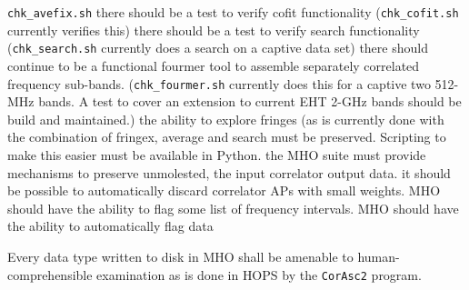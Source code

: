 \begin{description}
    \texttt{chk\_avefix.sh}
 there should be a test to verify \acs{cofit} functionality
    (\texttt{chk\_cofit.sh} currently verifies this)
 there should be a test to verify \acs{search} functionality
    (\texttt{chk\_search.sh} currently does a search on a captive
    data set)
 there should continue to be a functional \acs{fourmer} tool
    to assemble separately correlated frequency sub-bands.
    (\texttt{chk\_fourmer.sh} currently does this for a
    captive two 512-MHz bands.  A test to cover an extension
    to current \acs{EHT} 2-GHz bands should be build and maintained.)
 the ability to explore fringes (as is currently done with
    the combination of \ac{fringex}, \ac{average} and search must be
    preserved.  Scripting to make this easier must be available in
    \ac{Python}.
 the \ac{MHO} suite must provide mechanisms to preserve
    unmolested, the input correlator output data.
 it should be possible to automatically discard correlator
    \acsp{AP} with small weights.
 \ac{MHO} should have the ability to flag some list of frequency
    intervals.
 \ac{MHO} should have the ability to automatically flag data

 Every data type written to disk in \ac{MHO} shall be 
    amenable to human-comprehensible examination as is done in \ac{HOPS}
    by the \texttt{\ac{CorAsc2}} program.


\end{description}
